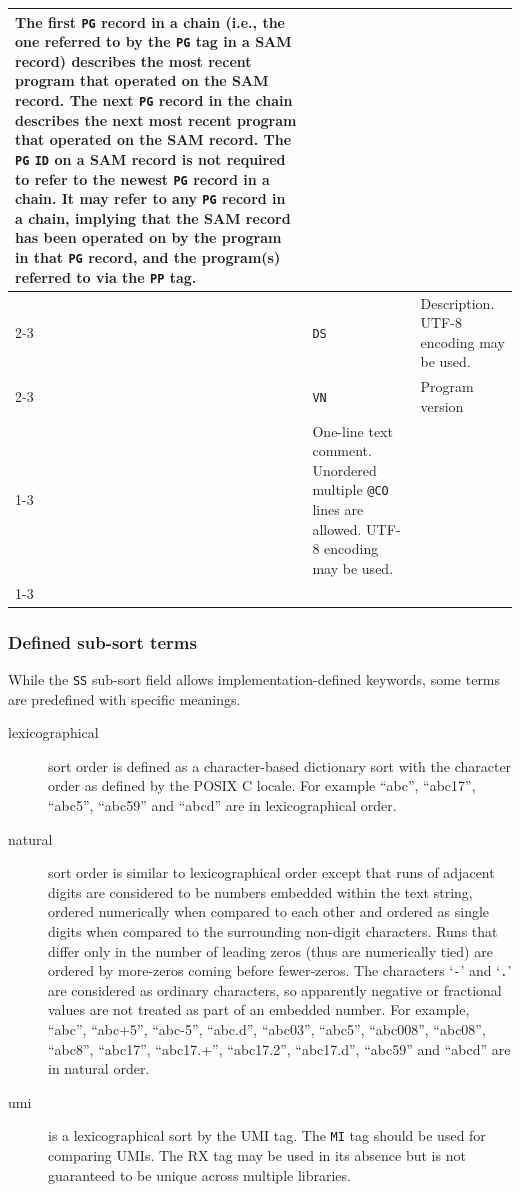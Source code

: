 \documentclass[10pt]{article}
\begin{document}
\begin{center}
\begin{longtable}{|l|l|p{13.5cm}|}
	The first {\tt PG} record in a chain (i.e., the one referred to by the {\tt PG} tag in a SAM record)
	describes the most recent program that operated on the SAM record.
	The next {\tt PG} record in the chain describes the next most recent program that
        operated on the SAM record. The {\tt PG} {\tt ID} on a SAM record is not required
        to refer to the newest {\tt PG} record in a chain.  It may refer to any {\tt PG}
        record in a chain, implying that the SAM record has been operated on by the
        program in that {\tt PG} record, and the program(s) referred to via the {\tt PP} tag. \\\cline{2-3}
  & {\tt DS} & Description.  UTF-8 encoding may be used.\\\cline{2-3}
  & {\tt VN} & Program version \\\cline{1-3}
  \multicolumn{2}{|l}{\tt @CO} & One-line text comment. Unordered multiple {\tt @CO} lines are allowed. UTF-8 encoding may be used.\\
  \cline{1-3}
\end{longtable}
\end{center}

\subsubsection{Defined sub-sort terms}\label{sec:sub-sort}

While the {\tt SS} sub-sort field allows implementation-defined keywords, some terms are predefined with specific meanings.

\begin{description}
\item[lexicographical] sort order is defined as a character-based dictionary sort with the character order as defined by the POSIX C locale.
  For example ``abc'', ``abc17'', ``abc5'', ``abc59'' and ``abcd'' are in lexicographical order.

\item[natural] sort order is similar to lexicographical order except that runs of adjacent digits are considered to be numbers embedded within the text string, ordered numerically when compared to each other and ordered as single digits when compared to the surrounding non-digit characters.
Runs that differ only in the number of leading zeros (thus are numerically tied) are ordered by more-zeros coming before fewer-zeros.
The characters `\texttt{-}' and `\texttt{.}' are considered as ordinary characters, so apparently negative or fractional values are not treated as part of an embedded number.
  For example, ``abc'', ``abc+5'', ``abc-5'', ``abc.d'', ``abc03'', ``abc5'', ``abc008'', ``abc08'', ``abc8'', ``abc17'', ``abc17.+'', ``abc17.2'', ``abc17.d'', ``abc59'' and ``abcd'' are in natural order.

\item[umi] is a lexicographical sort by the UMI tag.
  The {\tt MI} tag should be used for comparing UMIs. The RX tag may be used in its absence but is not guaranteed to be unique across multiple libraries.

\end{description}
\end{document}
